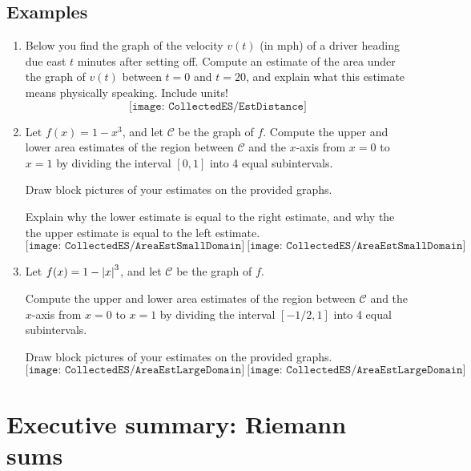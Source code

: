 

\subsection*{Examples}
\begin{enumerate}
  \item Below you find the graph of the velocity $v(t)$ (in mph) of a driver heading due east $t$ minutes after setting off. Compute an estimate of the area under the graph of $v(t)$ between $t=0$ and $t=20$, and explain what this estimate means physically speaking. Include units!
  \[
  \texttt{[image: CollectedES/EstDistance]}
  \]
  \item Let $f(x)=1-x^3$, and let $\mathcal{C}$ be the graph of $f$.
  Compute the upper and lower area estimates of the region between $\mathcal{C}$ and the $x$-axis from $x=0$ to $x=1$ by dividing the interval $[0,1]$ into 4 equal subintervals.

  Draw block pictures of your estimates on the provided graphs.

  Explain why the lower estimate is equal to the right estimate, and why the the upper estimate is equal to the left estimate.
  \[
  \texttt{[image: CollectedES/AreaEstSmallDomain]}\  \texttt{[image: CollectedES/AreaEstSmallDomain]}
  \]

\item Let $f(x)=1-\left\lvert x\right\rvert_{}^3$, and let $\mathcal{C}$ be the graph of $f$.

Compute the upper and lower area estimates of the region between $\mathcal{C}$ and the $x$-axis from $x=0$ to $x=1$ by dividing the interval $[-1/2,1]$ into 4 equal subintervals.

Draw block pictures of your estimates on the provided graphs.
\[
\texttt{[image: CollectedES/AreaEstLargeDomain]}\  \texttt{[image: CollectedES/AreaEstLargeDomain]}
\]
\end{enumerate}




\newpage

\section{Executive summary: Riemann sums}

